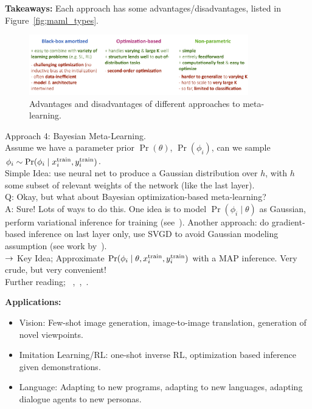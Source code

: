 {\bf Takeaways:} Each approach has some advantages/disadvantages, listed in Figure~\ref{fig;maml_types}.
\begin{figure}[h!]
\centering
\includegraphics[width=0.85\textwidth]{images/maml_types.jpg}
\caption{Advantages and disadvantages of different approaches to meta-learning.}
\label{fig:maml_types}
\end{figure}


Approach 4: Bayesian Meta-Learning. \\

Assume we have a parameter prior $\Pr(\theta)$, $\Pr(\phi_i)$, can we sample $\phi_i \sim \Pr(\phi_i \mid x_i^{\text{train}}, y_i^{\text{train}})$. \\

Simple Idea: use neural net to produce a Gaussian distribution over $h$, with $h$ some subset of relevant weights of the network (like the last layer). \\


Q: Okay, but what about Bayesian optimization-based meta-learning? \\

A: Sure! Lots of ways to do this. One idea is to model $\Pr(\phi_i \mid \theta)$ as Gaussian, perform variational inference for training (see~\citet{ravi2018amortized}). Another approach: do gradient-based inference on last layer only, use SVGD to avoid Gaussian modeling assumption (see work by~\citet{liu2016stein}). \\

$\rightarrow$ Key Idea; Approximate $\Pr(\phi_i \mid \theta, x_i^{\text{train}}, y_i^{\text{train}})$ with a MAP inference. Very crude, but very convenient! \\


Further reading; ~\citet{garnelo2018conditional},~\citet{kim2018bayesian},~\citet{ravi2018amortized}.


{\bf Applications:}
\begin{itemize}
\item Vision: Few-shot image generation, image-to-image translation, generation of novel viewpoints.
\item Imitation Learning/RL: one-shot inverse RL, optimization based inference given demonstrations.
\item Language: Adapting to new programs, adapting to new languages, adapting dialogue agents to new personas.
\end{itemize}

